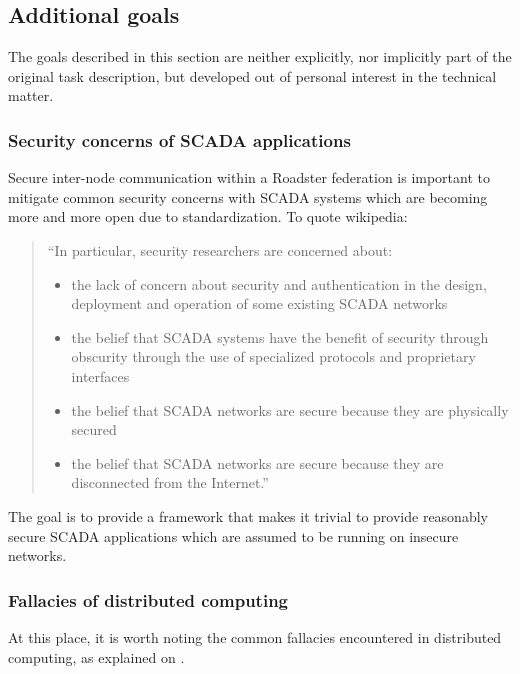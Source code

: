 \subsection{Additional goals}\label{sec:scope:add-goals}
The goals described in this section are neither explicitly, nor implicitly part
of the original task description, but developed out of personal interest in the
technical matter.

\subsubsection{Security concerns of SCADA applications}
Secure inter-node communication within a Roadster federation is important to
mitigate common security concerns with SCADA systems which are becoming more
and more open due to standardization. To quote \cite[Security issues]{wp:scada}
wikipedia:

\begin{quote}
``In particular, security researchers are concerned about:
	\begin{itemize}
		\item the lack of concern about security and authentication in
			the design, deployment and operation of some existing
			SCADA networks
		\item the belief that SCADA systems have the benefit of
			security through obscurity through the use of
			specialized protocols and proprietary interfaces
		\item the belief that SCADA networks are secure because they
			are physically secured
		\item the belief that SCADA networks are secure because they
			are disconnected from the Internet.''
	\end{itemize}
\end{quote}

The goal is to provide a framework that makes it trivial to provide reasonably
secure SCADA applications which are assumed to be running on insecure networks.

\subsubsection{Fallacies of distributed computing}
At this place, it is worth noting the common fallacies encountered in
distributed computing, as explained on \cite{dcomp:fallacies}.

